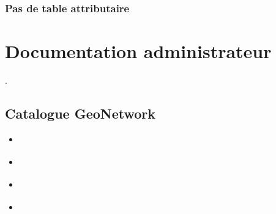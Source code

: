\documentclass[letterpaper,10pt,french]{sphinxmanual}
\begin{document}
\subsection{Pas de table attributaire}
\label{\detokenize{doc_user/error:pas-de-table-attributaire}}
\sphinxstepscope


\chapter{Documentation administrateur}
\label{\detokenize{doc_admin:documentation-administrateur}}\label{\detokenize{doc_admin::doc}}
\sphinxAtStartPar
{}.

\sphinxstepscope


\section{Catalogue \sphinxhyphen{} GeoNetwork}
\label{\detokenize{doc_admin/catalogue:catalogue-geonetwork}}\label{\detokenize{doc_admin/catalogue::doc}}
\begin{sphinxShadowBox}
\begin{itemize}
\item {} 
\sphinxAtStartPar
{}\label{\detokenize{doc_admin/catalogue:id1}}{\hyperref[\detokenize{doc_admin/catalogue:introduction}]{}}

\item {} 
\sphinxAtStartPar
{}\label{\detokenize{doc_admin/catalogue:id2}}{\hyperref[\detokenize{doc_admin/catalogue:gestion-des-fiches-de-metadonnees}]{}}

\item {} 
\sphinxAtStartPar
{}\label{\detokenize{doc_admin/catalogue:id3}}{\hyperref[\detokenize{doc_admin/catalogue:gerer-les-droits-d-acces-aux-fiches-de-metadonnees}]{}}

\item {} 
\sphinxAtStartPar
{}\label{\detokenize{doc_admin/catalogue:id4}}{\hyperref[\detokenize{doc_admin/catalogue:administration}]{}}

\end{itemize}
\end{sphinxShadowBox}
\end{document}
